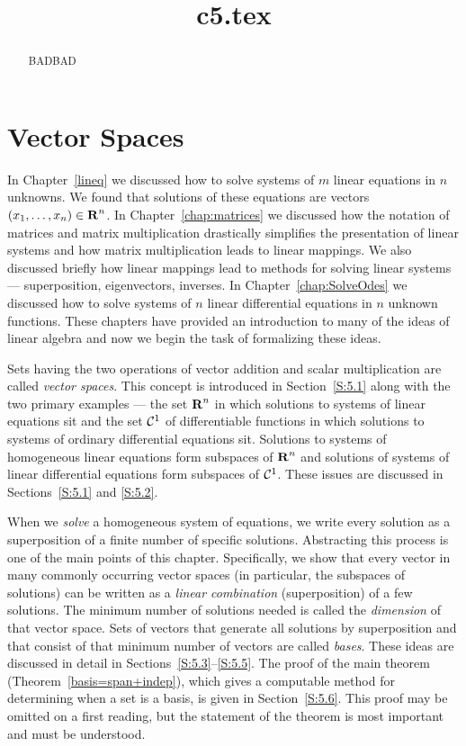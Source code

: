 \documentclass{ximera}
\title{c5.tex}
\begin{document}
\begin{abstract}
BADBAD
\end{abstract}
\maketitle

\chapter{Vector Spaces}
\label{C:vectorspaces}

\normalsize

In Chapter~\ref{lineq} we discussed how to solve systems of $m$
linear equations in $n$ unknowns.  We found that solutions of
these equations are vectors $(x_1,\ldots,x_n)\in\mbox{$\bf{R}$}^n$.  
In Chapter~\ref{chap:matrices} we discussed how the notation of
matrices and matrix multiplication drastically simplifies the
presentation of linear systems and how matrix multiplication
leads to linear mappings.  We also discussed briefly how linear
mappings lead to methods for solving linear systems ---
superposition, eigenvectors, inverses.  In
Chapter~\ref{chap:SolveOdes} we discussed how to solve systems
of $n$ linear differential equations in $n$ unknown functions.
These chapters have
provided an introduction to many of the ideas of linear algebra
and now we begin the task of formalizing these ideas.

Sets having the two operations of vector addition and scalar
multiplication are called {\em vector spaces\/}.  This concept
is introduced in Section~\ref{S:5.1} along with the two
primary examples --- the set $\mbox{$\bf{R}$}^n$ in which solutions to systems
of linear equations sit and the set ${\cal C}^1$ of differentiable
functions in which solutions to systems of ordinary differential
equations sit.  Solutions to systems of homogeneous linear equations
form subspaces of $\mbox{$\bf{R}$}^n$ and solutions of systems of linear
differential equations form subspaces of ${\cal C}^1$.  These issues
are discussed in Sections~\ref{S:5.1} and \ref{S:5.2}.

When we {\em solve\/} a homogeneous system of equations, we write
every solution as a superposition of a finite number of specific
solutions.  Abstracting this process is one of the main points of this
chapter.  Specifically, we show that every vector in many commonly
occurring vector spaces
(in particular, the subspaces of solutions) can be written as a
{\em linear combination\/} (superposition) of a few 
solutions.  The minimum number of solutions needed is called
the {\em dimension\/} of that vector space.  Sets of vectors that 
generate all solutions by superposition and that consist of that minimum 
number of vectors are called {\em bases\/}.  These ideas are discussed
in detail in Sections~\ref{S:5.3}--\ref{S:5.5}.  The proof of
the main theorem (Theorem~\ref{basis=span+indep}), which gives a
computable method for determining when a set is a basis, is given in
Section~\ref{S:5.6}.  This proof may be omitted on a first reading,
but the statement of the theorem is most important and must be
understood.
\end{document}

